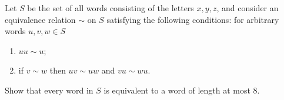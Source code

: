 \documentclass{article}
\begin{document}
	\setlength{\parindent}{0pt}
    Let $S$ be the set of all words consisting of the letters $x,y,z$, and consider an equivalence relation $\sim$ on $S$ satisfying the following conditions: for arbitrary words $u,v,w\in S$
    \begin{enumerate}[label=(\roman*)]
    	\item $uu\sim u$;
    	\item if $v\sim w$ then $uv\sim uw$ and $vu\sim wu$.
    \end{enumerate}
    Show that every word in $S$ is equivalent to a word of length at most 8.
\end{document}
